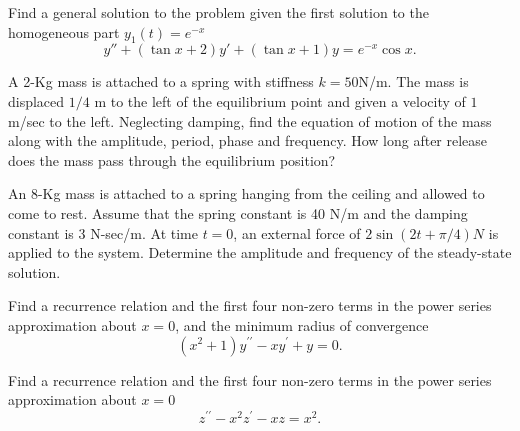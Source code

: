 \documentclass[11pt]{article}
\begin{document}
\begin{problem}
Find a general solution to the problem given the first solution to the homogeneous part $y_{1}(t)=e^{-x}$
\begin{equation*}
y''+(\tan x +2)y'+(\tan x+1)y=e^{-x}\cos x.
\end{equation*}
\end{problem}
% 
% 

\begin{problem}
A 2-Kg mass is attached to a spring with stiffness $k = 50$N/m. The mass is displaced $1/4$ m to the left of the equilibrium point and given a velocity of $1$m/sec to the left. Neglecting damping, find the equation of motion of the mass along with the amplitude, period, phase and frequency. How long after release does the mass pass through the equilibrium position?
\end{problem}


\begin{problem}
An 8-Kg mass is attached to a spring hanging from the ceiling and allowed to come to rest. Assume that the spring constant is 40 N/m and the damping constant is 3 N-sec/m. At time $t=0$, an external force of $2\sin(2t +\pi/4)N$ is applied to the system. Determine the amplitude and frequency of the steady-state solution.
\end{problem}
% 
% 





\begin{problem}{Find a recurrence relation and the first four non-zero terms in the power series approximation about $x=0$, and the minimum radius of convergence}
\begin{equation*}
(x^2+1)y^{\prime \prime} - x y^{\prime} + y =0.
\end{equation*}
\end{problem}


\begin{problem}
{Find a recurrence relation and the first four non-zero terms in the power series approximation about $x=0$}
\begin{equation*}
z^{\prime \prime} - x^2 z^{\prime} - xz =x^2.
\end{equation*}
\end{problem}


\end{document}
